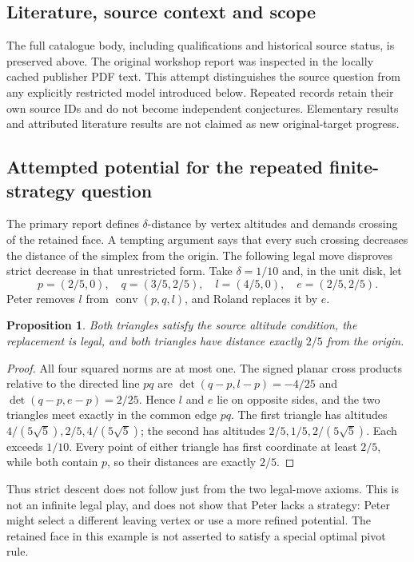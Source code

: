 \documentclass[11pt]{article}
\newtheorem{proposition}{Proposition}
\begin{document}
\subsection{Literature, source context and scope}
The full catalogue body, including qualifications and historical source status, is preserved above. The original workshop report was inspected in the locally cached publisher PDF text. This attempt distinguishes the source question from any explicitly restricted model introduced below. Repeated records retain their own source IDs and do not become independent conjectures. Elementary results and attributed literature results are not claimed as new original-target progress.

\subsection{Attempted potential for the repeated finite-strategy question}
The primary report defines $\delta$-distance by vertex altitudes and demands crossing of the retained face. A tempting argument says that every such crossing decreases the distance of the simplex from the origin. The following legal move disproves strict decrease in that unrestricted form.
Take $\delta=1/10$ and, in the unit disk, let
\[
 p=(2/5,0),\quad q=(3/5,2/5),\quad l=(4/5,0),\quad e=(2/5,2/5).
\]
Peter removes $l$ from $\operatorname{conv}(p,q,l)$, and Roland replaces it by $e$.
\begin{proposition}
Both triangles satisfy the source altitude condition, the replacement is legal, and both triangles have distance exactly $2/5$ from the origin.
\end{proposition}
\begin{proof}
All four squared norms are at most one. The signed planar cross products relative to the directed line $p q$ are
$\det(q-p,l-p)=-4/25$ and $\det(q-p,e-p)=2/25$.
Hence $l$ and $e$ lie on opposite sides, and the two triangles meet exactly in the common edge $p q$. The first triangle has altitudes $4/(5\sqrt5),2/5,4/(5\sqrt5)$; the second has altitudes $2/5,1/5,2/(5\sqrt5)$. Each exceeds $1/10$. Every point of either triangle has first coordinate at least $2/5$, while both contain $p$, so their distances are exactly $2/5$.
\end{proof}
Thus strict descent does not follow just from the two legal-move axioms. This is not an infinite legal play, and does not show that Peter lacks a strategy: Peter might select a different leaving vertex or use a more refined potential. The retained face in this example is not asserted to satisfy a special optimal pivot rule.
\end{document}
